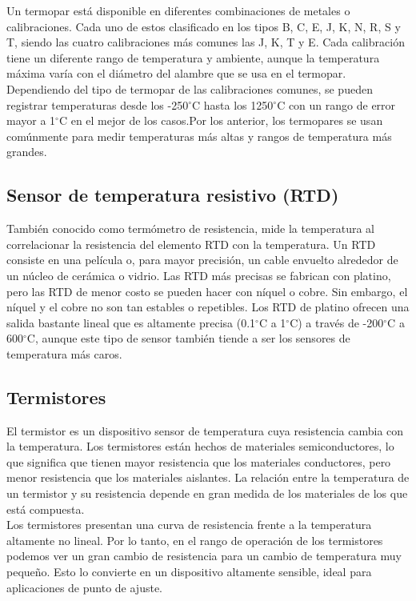 	Un termopar está disponible en diferentes combinaciones de metales o calibraciones. Cada uno de estos clasificado en los tipos B, C, E, J, K, N, R, S y T, siendo las cuatro calibraciones más comunes las J, K, T y E. Cada calibración tiene un diferente rango de temperatura y ambiente, aunque la temperatura máxima varía con el diámetro del alambre que se usa en el termopar. \cite{omegaTermopar} \\
	
	Dependiendo del tipo de termopar de las calibraciones comunes, se pueden registrar temperaturas desde los -250$^{\circ}$C hasta los 1250$^{\circ}$C con un rango de error mayor a 1$^{\circ}$C en el mejor de los casos.Por los anterior, los termopares se usan comúnmente para medir temperaturas más altas y rangos de temperatura más grandes. \cite{elprocusTempSens}	
	
	
	\subsection{Sensor de temperatura resistivo (RTD)}
	También conocido como termómetro de resistencia, mide la temperatura al correlacionar la resistencia del elemento RTD con la temperatura. Un RTD consiste en una película o, para mayor precisión, un cable envuelto alrededor de un núcleo de cerámica o vidrio. Las RTD más precisas se fabrican con platino, pero las RTD de menor costo se pueden hacer con níquel o cobre. Sin embargo, el níquel y el cobre no son tan estables o repetibles. Los RTD de platino ofrecen una salida bastante lineal que es altamente precisa (0.1$^{\circ}$C a 1$^{\circ}$C) a través de -200$^{\circ}$C a 600$^{\circ}$C, aunque este tipo de sensor también tiende a ser los sensores de temperatura más caros. \cite{amethermTemp}
	
	
	\subsection{Termistores}
	El termistor es un dispositivo sensor de temperatura cuya resistencia cambia con la temperatura. Los termistores están hechos de materiales semiconductores, lo que significa que tienen mayor resistencia que los materiales conductores, pero menor resistencia que los materiales aislantes. La relación entre la temperatura de un termistor y su resistencia depende en gran medida de los materiales de los que está compuesta. \cite{elprocusTempSens} \\

	Los termistores presentan una curva de resistencia frente a la temperatura altamente no lineal. Por lo tanto, en el rango de operación de los termistores podemos ver un gran cambio de resistencia para un cambio de temperatura muy pequeño. Esto lo convierte en un dispositivo altamente sensible, ideal para aplicaciones de punto de ajuste. \\

